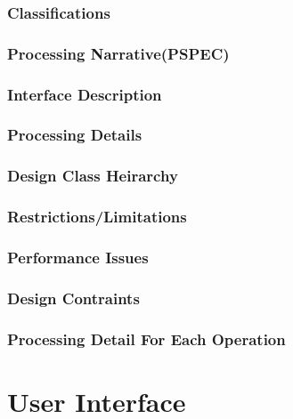 \documentclass[11pt]{article}
\begin{document}
\subsubsection{Classifications}
\label{sec:classifications}

\subsubsection{Processing Narrative(PSPEC)}
\label{sec:pspec}

\subsubsection{Interface Description}
\label{sec:interface}

\subsubsection{Processing Details}
\label{sec:details}

\subsubsection{Design Class Heirarchy}
\label{sec:heirarchy}

\subsubsection{Restrictions/Limitations}
\label{sec:restrictions}

\subsubsection{Performance Issues}
\label{sec:performance}

\subsubsection{Design Contraints}
\label{sec:designconstraints}

\subsubsection{Processing Detail For Each Operation}
\label{sec:operation}

\section{User Interface}
\label{sec:userinterface}
\end{document}
